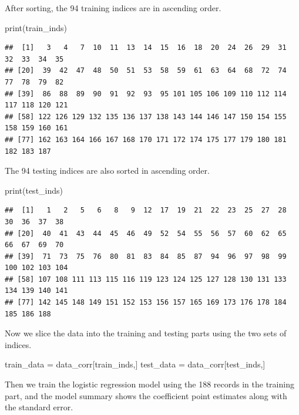 \documentclass[
]{article}
\newenvironment{Shaded}{\begin{snugshade}}{\end{snugshade}}
\newcommand{\FunctionTok}[1]{\textcolor[rgb]{0.00,0.00,0.00}{#1}}
\newcommand{\NormalTok}[1]{#1}
\newcommand{\OtherTok}[1]{\textcolor[rgb]{0.56,0.35,0.01}{#1}}
\begin{document}
After sorting, the 94 training indices are in ascending order.

\begin{Shaded}
\begin{Highlighting}[]
\FunctionTok{print}\NormalTok{(train\_inds)}
\end{Highlighting}
\end{Shaded}

\begin{verbatim}
##  [1]   3   4   7  10  11  13  14  15  16  18  20  24  26  29  31  32  33  34  35
## [20]  39  42  47  48  50  51  53  58  59  61  63  64  68  72  74  77  78  79  82
## [39]  86  88  89  90  91  92  93  95 101 105 106 109 110 112 114 117 118 120 121
## [58] 122 126 129 132 135 136 137 138 143 144 146 147 150 154 155 158 159 160 161
## [77] 162 163 164 166 167 168 170 171 172 174 175 177 179 180 181 182 183 187
\end{verbatim}

The 94 testing indices are also sorted in ascending order.

\begin{Shaded}
\begin{Highlighting}[]
\FunctionTok{print}\NormalTok{(test\_inds)}
\end{Highlighting}
\end{Shaded}

\begin{verbatim}
##  [1]   1   2   5   6   8   9  12  17  19  21  22  23  25  27  28  30  36  37  38
## [20]  40  41  43  44  45  46  49  52  54  55  56  57  60  62  65  66  67  69  70
## [39]  71  73  75  76  80  81  83  84  85  87  94  96  97  98  99 100 102 103 104
## [58] 107 108 111 113 115 116 119 123 124 125 127 128 130 131 133 134 139 140 141
## [77] 142 145 148 149 151 152 153 156 157 165 169 173 176 178 184 185 186 188
\end{verbatim}

Now we slice the data into the training and testing parts using the two
sets of indices.

\begin{Shaded}
\begin{Highlighting}[]
\NormalTok{train\_data }\OtherTok{=}\NormalTok{ data\_corr[train\_inds,]}
\NormalTok{test\_data }\OtherTok{=}\NormalTok{ data\_corr[test\_inds,]}
\end{Highlighting}
\end{Shaded}

Then we train the logistic regression model using the 188 records in the
training part, and the model summary shows the coefficient point
estimates along with the standard error.
\end{document}
